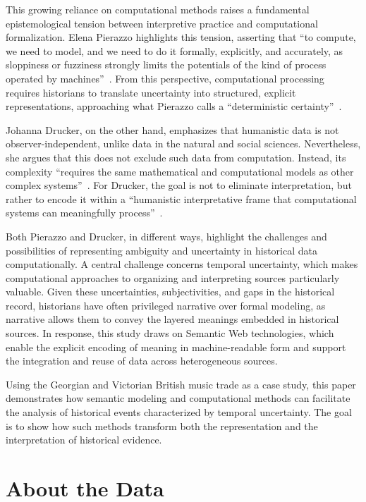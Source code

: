 \documentclass[final]{anthology-ch} %
\begin{document}
This growing reliance on computational methods raises a fundamental epistemological tension between interpretive practice and computational formalization. Elena Pierazzo highlights this tension, asserting that \enquote{to compute, we need to model, and we need to do it formally, explicitly, and accurately, as sloppiness or fuzziness strongly limits the potentials of the kind of process operated by machines}~\cite[120]{pierazzo2019subjective}. From this perspective, computational processing requires historians to translate uncertainty into structured, explicit representations, approaching what Pierazzo calls a \enquote{deterministic certainty}~\cite[120]{pierazzo2019subjective}.

Johanna Drucker, on the other hand, emphasizes that humanistic data is not observer-independent, unlike data in the natural and social sciences. Nevertheless, she argues that this does not exclude such data from computation. Instead, its complexity \enquote{requires the same mathematical and computational models as other complex systems}~\cite[para.~18]{drucker2011humanities}. For Drucker, the goal is not to eliminate interpretation, but rather to encode it within a \enquote{humanistic interpretative frame that computational systems can meaningfully process}~\cite[para.~49]{drucker2011humanities}.

Both Pierazzo and Drucker, in different ways, highlight the challenges and possibilities of representing ambiguity and uncertainty in historical data computationally. A central challenge concerns temporal uncertainty, which makes computational approaches to organizing and interpreting sources particularly valuable. Given these uncertainties, subjectivities, and gaps in the historical record, historians have often privileged narrative over formal modeling, as narrative allows them to convey the layered meanings embedded in historical sources. In response, this study draws on Semantic Web technologies, which enable the explicit encoding of meaning in machine-readable form and support the integration and reuse of data across heterogeneous sources.

Using the Georgian and Victorian British music trade as a case study, this paper demonstrates how semantic modeling and computational methods can facilitate the analysis of historical events characterized by temporal uncertainty. The goal is to show how such methods transform both the representation and the interpretation of historical evidence.

\section{About the Data} \label{sec:data}
\end{document}
